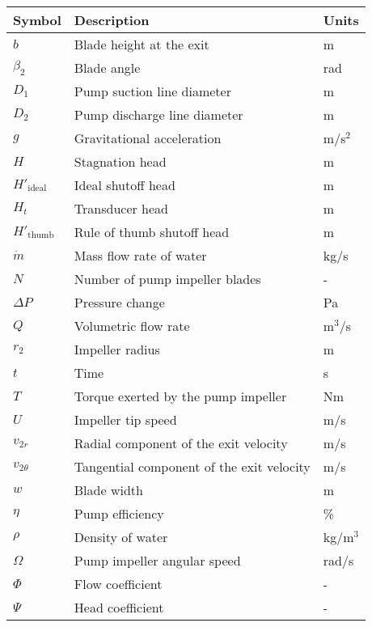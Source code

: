 \begin{longtable}{l l l}
    \toprule
    Symbol & Description & Units \\
    \midrule
    $b$ & Blade height at the exit & m \\
    $\beta_2$ & Blade angle & rad \\
    $D_1$ & Pump suction line diameter & m \\
    $D_2$ & Pump discharge line diameter & m \\
    $g$ & Gravitational acceleration & m/s$^2$ \\
    $H$ & Stagnation head & m \\
    $H'_{\text{ideal}}$ & Ideal shutoff head & m \\
    $H_t$ & Transducer head & m \\
    $H'_{\text{thumb}}$ & Rule of thumb shutoff head & m \\
    $\dot{m}$ & Mass flow rate of water & kg/s \\
    $N$ & Number of pump impeller blades & - \\
    $\Delta P$ & Pressure change & Pa \\
    $Q$ & Volumetric flow rate & m$^3$/s \\
    $r_2$ & Impeller radius & m \\
    $t$ & Time & s \\
    $T$ & Torque exerted by the pump impeller & Nm \\
    $U$ & Impeller tip speed & m/s \\
    $v_{2r}$ & Radial component of the exit velocity & m/s \\
    $v_{2\theta}$ & Tangential component of the exit velocity & m/s \\
    $w$ & Blade width & m \\
    $\eta$ & Pump efficiency & \% \\
    $\rho$ & Density of water & kg/m$^3$ \\
    $\Omega$ & Pump impeller angular speed & rad/s \\
    $\Phi$ & Flow coefficient & - \\
    $\Psi$ & Head coefficient & - \\
    \bottomrule
\end{longtable}






